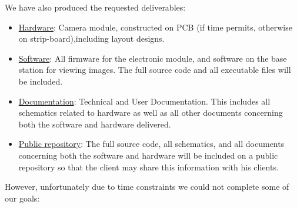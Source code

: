We have also produced the requested deliverables:

\begin{itemize}
	\item \underline{Hardware}: Camera module, constructed on PCB (if time permits, otherwise on strip-board),including layout designs.
	\item \underline{Software}: All firmware for the electronic module, and software on the base station for viewing images. The full source code and all executable files will be included.
	\item \underline{Documentation}: Technical and User Documentation. This includes all schematics related to hardware as well as all other documents concerning both the software and hardware delivered.
	\item \underline{Public repository}: The full source code, all schematics, and all documents concerning both the software and hardware will be included on a public repository so that the client may share this information with his clients.
\end{itemize}

However, unfortunately due to time constraints we could not complete
some of our goals:

